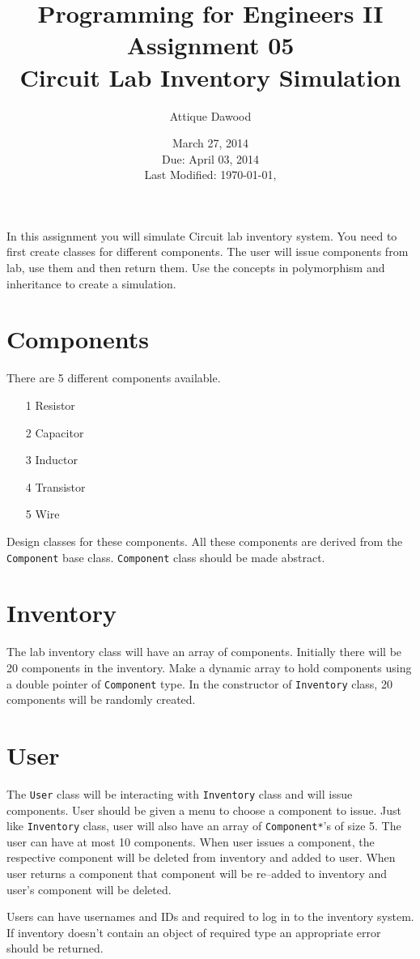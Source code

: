 \documentclass[12pt,a4paper]{article}
\title{\vspace{-2cm}Programming for Engineers II\\Assignment 05\\Circuit Lab Inventory Simulation}
\author{Attique Dawood}
\date{March 27, 2014\\Due: April 03, 2014\\[0.2cm] Last Modified: \today, \currenttime}
\begin{document}
\maketitle
In this assignment you will simulate Circuit lab inventory system. You need to first create classes for different components. The user will issue components from lab, use them and then return them. Use the concepts in polymorphism and inheritance to create a simulation.

\section{Components}
There are 5 different components available.
\begin{itemize}
\item[1] Resistor
\item[2] Capacitor
\item[3] Inductor
\item[4] Transistor
\item[5] Wire
\end{itemize}
Design classes for these components. All these components are derived from the \verb|Component| base class. \verb|Component| class should be made abstract.
\section{Inventory}
The lab inventory class will have an array of components. Initially there will be 20 components in the inventory. Make a dynamic array to hold components using a double pointer of \verb|Component| type. In the constructor of \verb|Inventory| class, 20 components will be randomly created.
\section{User}
The \verb|User| class will be interacting with \verb|Inventory| class and will issue components. User should be given a menu to choose a component to issue. Just like \verb|Inventory| class, user will also have an array of \verb|Component*|'s of size 5. The user can have at most 10 components. When user issues a component, the respective component will be deleted from inventory and added to user. When user returns a component that component will be re--added to inventory and user's component will be deleted.

Users can have usernames and IDs and required to log in to the inventory system. If inventory doesn't contain an object of required type an appropriate error should be returned.
\end{document}
